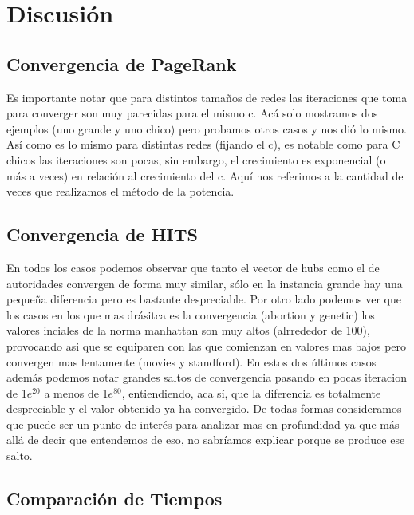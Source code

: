 \section{Discusi\'on}

\subsection{Convergencia de PageRank}
Es importante notar que para distintos tamaños de redes las iteraciones que toma para converger son muy parecidas para el mismo c. Acá solo mostramos dos ejemplos (uno grande y uno chico) pero probamos otros casos y nos dió lo mismo. \\
Así como es lo mismo para distintas redes (fijando el c), es notable como para C chicos las iteraciones son pocas, sin embargo, el crecimiento es exponencial (o más a veces) en relación al crecimiento del c. Aquí nos referimos a la cantidad de veces que realizamos el método de la potencia.

\subsection{Convergencia de HITS}
En todos los casos podemos observar que tanto el vector de hubs como el de autoridades convergen de forma muy similar, sólo en la instancia grande hay una pequeña diferencia pero es bastante despreciable. 
Por otro lado podemos ver que los casos en los que mas drásitca es la convergencia (abortion y genetic) los valores inciales de la norma manhattan son muy altos (alrrededor de 100), provocando asi que se equiparen con las que comienzan en valores mas bajos pero convergen mas lentamente (movies y standford).
En estos dos últimos casos además podemos notar grandes saltos de convergencia pasando en pocas iteracion de 1$e^{20}$ a menos de 1$e^{80}$, entiendiendo, aca sí, que la diferencia es totalmente despreciable y el valor obtenido ya ha convergido. De todas formas consideramos que puede ser un punto de interés para analizar mas en profundidad ya que más allá de decir que entendemos de eso, no sabríamos explicar porque se produce ese salto. 

\subsection{Comparación de Tiempos}

